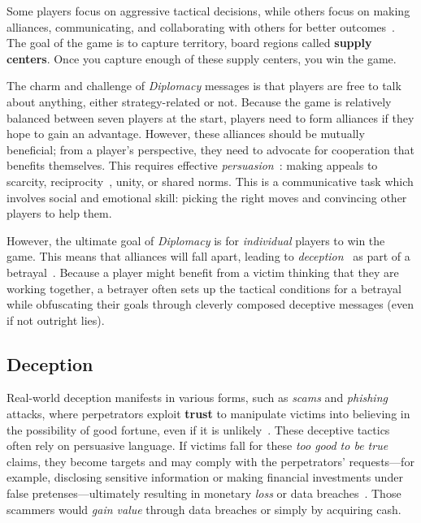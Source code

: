 \documentclass[oneside]{memoir}
\begin{document}
Some players focus on aggressive tactical decisions, while others
focus on making alliances, communicating, and collaborating with
others for better outcomes~\citep{pulsiphergames}.
%
The goal of the game is to capture territory, board regions called \textbf{supply centers}. Once you capture enough of these supply centers, you win the game.

The charm and challenge of \textit{Diplomacy} messages is that players
are free to talk about anything, either strategy-related or not. Because the game is relatively balanced between seven players at the
start, players need to form alliances if they hope to gain an advantage.
%
However, these alliances should be mutually beneficial; from a
player's perspective, they need to advocate for cooperation that 
benefits themselves.
%
This requires effective \emph{persuasion}~\citep{Cialdini1993InfluenceTP}: making
appeals to scarcity, reciprocity~\citep{kramar2022negotiation}, unity, or shared norms.
%
This is a communicative task which involves social and emotional skill: picking the right moves and convincing other players to help them.

However, the ultimate goal of \textit{Diplomacy} is for \emph{individual} players to
win the game.
%
This means that alliances will fall apart, leading to \emph{deception}~\citep{peskov2020takes}
as part of a betrayal~\citep{Niculae:Kumar:Boyd-Graber:Danescu-Niculescu-Mizil-2015}.
%
%
Because a player might benefit from a victim thinking that they are
working together, a betrayer often sets up the
tactical conditions for a betrayal while obfuscating their goals through cleverly composed deceptive messages (even if not outright lies).

\subsection{Deception}
Real-world deception manifests in various forms, such as \textit{scams} and \textit{phishing} attacks, where perpetrators exploit \textbf{trust} to manipulate victims into believing in the possibility of good fortune, even if it is unlikely~\citep{button2014online,muscanell2014weapons,hanoch2021scams}. These deceptive tactics often rely on persuasive language. If victims fall for these \textit{too good to be true} claims, they become targets and may comply with the perpetrators' requests---for example, disclosing sensitive information or making financial investments under false pretenses---ultimately resulting in monetary \textit{loss} or data breaches~\citep{burnes2017prevalence,coluccia2020online}. Those scammers would \textit{gain value} through data breaches or simply by acquiring cash.
\end{document}
